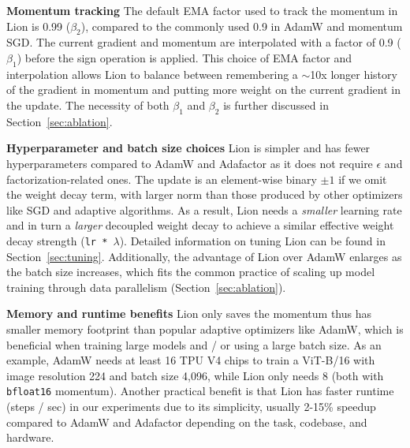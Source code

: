 \documentclass{article}
\newcommand{\name}{Lion}
\begin{document}
\textbf{Momentum tracking}
The default EMA factor used to track the momentum in \name{} is 0.99 ($\beta_2$), compared to the commonly used 0.9 in AdamW and momentum SGD. The current gradient and momentum are interpolated with a factor of 0.9 ($\beta_1$) before the sign operation is applied.
This choice of EMA factor and interpolation allows \name{} to balance between remembering a $\sim$10x longer history of the gradient in momentum and putting more weight on the current gradient in the update. The necessity of both $\beta_1$ and $\beta_2$ is further discussed in Section~\ref{sec:ablation}.


\textbf{Hyperparameter and batch size choices}
\name{} is simpler and has fewer hyperparameters compared to AdamW and Adafactor as it does not require $\epsilon$ and factorization-related ones. The update is an element-wise binary $\pm 1$ if we omit the weight decay term, with larger norm than those produced by other optimizers like SGD and adaptive algorithms. 
As a result, \name{} needs a \textit{smaller} learning rate and in turn a \textit{larger} decoupled weight decay to achieve a similar effective weight decay strength (\texttt{lr * $\lambda$}).
Detailed information on tuning \name{} can be found in Section~\ref{sec:tuning}.
Additionally, the advantage of \name{} over AdamW enlarges as the batch size increases, which fits the common practice of scaling up model training through data parallelism (Section~\ref{sec:ablation}).




\textbf{Memory and runtime benefits}
\name{} only saves the momentum thus has smaller memory footprint than popular adaptive optimizers like AdamW, which is beneficial when training large models and / or using a large batch size. 
As an example, AdamW needs at least 16 TPU V4 chips to train a ViT-B/16 with image resolution 224 and batch size 4,096, while \name{} only needs 8 (both with \texttt{bfloat16} momentum). 
Another practical benefit is that \name{} has faster runtime (steps / sec) in our experiments due to its simplicity, usually 2-15\% speedup compared to AdamW and Adafactor depending on the task, codebase, and hardware.
\end{document}
